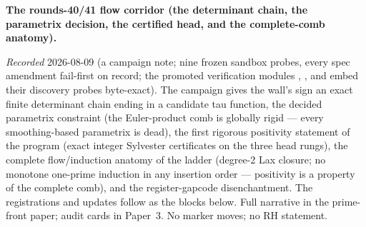 \par\smallskip\noindent\textbf{The rounds-40/41 flow corridor
(the determinant chain, the parametrix decision, the certified
head, and the complete-comb anatomy).}
{\sloppy
\emph{Recorded} 2026-08-09 (a campaign note; nine frozen sandbox
probes, every spec amendment fail-first on record; the promoted
verification modules
,
,
 and
 embed their discovery
probes byte-exact).  The campaign gives the wall's sign an exact
finite determinant chain ending in a candidate tau function, the
decided parametrix constraint (the Euler-product comb is
globally rigid --- every smoothing-based parametrix is dead),
the first rigorous positivity statement of the program (exact
integer Sylvester certificates on the three head rungs), the
complete flow/induction anatomy of the ladder (degree-2 Lax
closure; no monotone one-prime induction in any insertion order
--- positivity is a property of the complete comb), and the
register-gapcode disenchantment.  The registrations and updates
follow as the blocks below.  Full narrative in the prime-front
paper; audit cards in Paper~3.  No marker moves; no RH
statement.\par}


